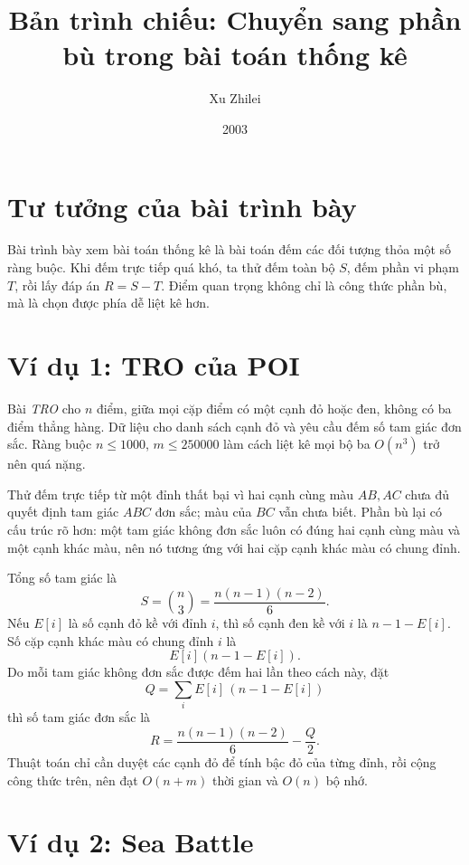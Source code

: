 \documentclass[11pt]{article}
\title{Bản trình chiếu: Chuyển sang phần bù trong bài toán thống kê}
\author{Xu Zhilei}
\date{2003}
\begin{document}
\maketitle


\section{Tư tưởng của bài trình bày}

Bài trình bày xem bài toán thống kê là bài toán đếm các đối tượng thỏa một
số ràng buộc. Khi đếm trực tiếp quá khó, ta thử đếm toàn bộ \(S\), đếm phần
vi phạm \(T\), rồi lấy đáp án \(R=S-T\). Điểm quan trọng không chỉ là công
thức phần bù, mà là chọn được phía dễ liệt kê hơn.

\section{Ví dụ 1: TRO của POI}

Bài \textit{TRO} cho \(n\) điểm, giữa mọi cặp điểm có một cạnh đỏ hoặc đen,
không có ba điểm thẳng hàng. Dữ liệu cho danh sách cạnh đỏ và yêu cầu đếm số
tam giác đơn sắc. Ràng buộc \(n\le 1000\), \(m\le 250000\) làm cách liệt kê
mọi bộ ba \(O(n^3)\) trở nên quá nặng.

Thử đếm trực tiếp từ một đỉnh thất bại vì hai cạnh cùng màu \(AB,AC\) chưa
đủ quyết định tam giác \(ABC\) đơn sắc; màu của \(BC\) vẫn chưa biết. Phần
bù lại có cấu trúc rõ hơn: một tam giác không đơn sắc luôn có đúng hai cạnh
cùng màu và một cạnh khác màu, nên nó tương ứng với hai cặp cạnh khác màu có
chung đỉnh.

Tổng số tam giác là
\[
  S=\binom n3=\frac{n(n-1)(n-2)}6.
\]
Nếu \(E[i]\) là số cạnh đỏ kề với đỉnh \(i\), thì số cạnh đen kề với \(i\) là
\(n-1-E[i]\). Số cặp cạnh khác màu có chung đỉnh \(i\) là
\[
  E[i](n-1-E[i]).
\]
Do mỗi tam giác không đơn sắc được đếm hai lần theo cách này, đặt
\[
  Q=\sum_i E[i]\,(n-1-E[i])
\]
thì số tam giác đơn sắc là
\[
  R=\frac{n(n-1)(n-2)}6-\frac Q2.
\]
Thuật toán chỉ cần duyệt các cạnh đỏ để tính bậc đỏ của từng đỉnh, rồi cộng
công thức trên, nên đạt \(O(n+m)\) thời gian và \(O(n)\) bộ nhớ.

\section{Ví dụ 2: Sea Battle}
\end{document}
